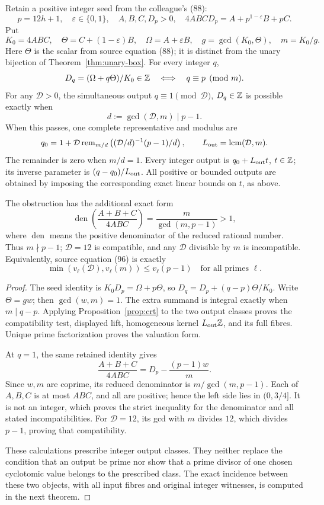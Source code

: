 \begin{proposition}
\label{prop:output-crt}
Retain a positive integer seed from the colleague's (88):
\[
 p=12h+1,\quad \varepsilon\in\{0,1\},\quad
 A,B,C,D_p>0,\quad
 4ABCD_p=A+p^{1-\varepsilon}B+pC.
\]
Put
\[
 K_0=4ABC,\quad
 \Theta=C+(1-\varepsilon)B,\quad
 \Omega=A+\varepsilon B,\quad
 g=\gcd(K_0,\Theta),\quad m=K_0/g.
\]
Here \(\Theta\) is the scalar from source equation (88);
it is distinct from the unary bijection of
Theorem~\ref{thm:unary-box}.
For every integer \(q\),
\[
 D_q=(\Omega+q\Theta)/K_0\in\mathbb Z
             \quad\Longleftrightarrow\quad q\equiv p\pmod m .
\]
For any \(\mathcal D>0\), the simultaneous output
\(q\equiv1\pmod{\mathcal D}\), \(D_q\in\mathbb Z\)
is possible exactly when
\[
 d:=\gcd(\mathcal D,m)\mid p-1.
\]
When this passes, one complete representative and modulus are
\[
 q_0=1+\mathcal D
  \operatorname{rem}_{m/d}
    \left((\mathcal D/d)^{-1}(p-1)/d\right),\qquad
 L_{\rm out}=\operatorname{lcm}(\mathcal D,m).
\]
The remainder is zero when \(m/d=1\).
Every integer output is \(q_0+L_{\rm out}t\), \(t\in\mathbb Z\);
its inverse parameter is \((q-q_0)/L_{\rm out}\).
All positive or bounded outputs are obtained by imposing
the corresponding exact linear bounds on \(t\), as above.

The obstruction has the additional exact form
\[
 \operatorname{den}\left(\frac{A+B+C}{4ABC}\right)
       =\frac{m}{\gcd(m,p-1)}>1,
\]
where \(\operatorname{den}\) means the positive denominator
of the reduced rational number.  Thus \(m\nmid p-1\);
\(\mathcal D=12\) is compatible, and any
\(\mathcal D\) divisible by \(m\) is incompatible.
Equivalently, source equation (96) is exactly
\[
 \min(v_\ell(\mathcal D),v_\ell(m))
                      \le v_\ell(p-1)\quad\text{for all primes }\ell.
\]
\end{proposition}
\begin{proof}
The seed identity is \(K_0D_p=\Omega+p\Theta\), so
\(D_q=D_p+(q-p)\Theta/K_0\).
Write \(\Theta=gw\); then \(\gcd(w,m)=1\).
The extra summand is integral exactly when \(m\mid q-p\).
Applying Proposition~\ref{prop:crt} to the two output
classes proves the compatibility test, displayed lift,
homogeneous kernel \(L_{\rm out}\mathbb Z\), and its full fibres.
Unique prime factorization proves the valuation form.

At \(q=1\), the same retained identity gives
\[
 \frac{A+B+C}{4ABC}
        =D_p-\frac{(p-1)w}{m}.
\]
Since \(w,m\) are coprime, its reduced denominator is
\(m/\gcd(m,p-1)\).
Each of \(A,B,C\) is at most \(ABC\), and all are positive;
hence the left side lies in \((0,3/4]\).
It is not an integer, which proves the strict inequality
for the denominator and all stated incompatibilities.
For \(\mathcal D=12\), its gcd with \(m\) divides \(12\),
which divides \(p-1\), proving that compatibility.

These calculations prescribe integer output classes.
They neither replace the condition that an output be prime
nor show that a prime divisor of one chosen cyclotomic
value belongs to the prescribed class. The exact incidence
between these two objects, with all input fibres and original
integer witnesses, is computed in the next theorem.
\end{proof}
